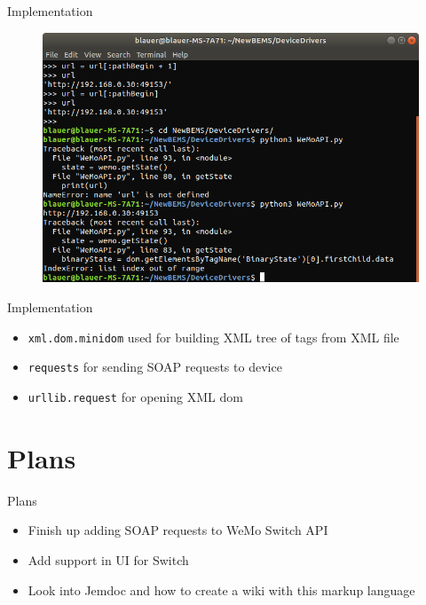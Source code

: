 \documentclass{beamer}
\begin{document}
\begin{frame}{Implementation}{}
\begin{figure}
\includegraphics[scale=0.4]{figs/img/getStateIndexError}
\end{figure}
\end{frame}

\begin{frame}{Implementation}{}
	\begin{itemize}
		\item \texttt{xml.dom.minidom} used for building XML tree of tags from XML file
		\item \texttt{requests} for sending SOAP requests to device
		\item \texttt{urllib.request} for opening XML dom
	\end{itemize}
\end{frame}

\section{Plans}
\begin{frame}{Plans}{}
	\begin{itemize}
		\item Finish up adding SOAP requests to WeMo Switch API
		\item Add support in UI for Switch
		\item Look into Jemdoc and how to create a wiki with this markup language
	\end{itemize}
\end{frame}
\end{document}
